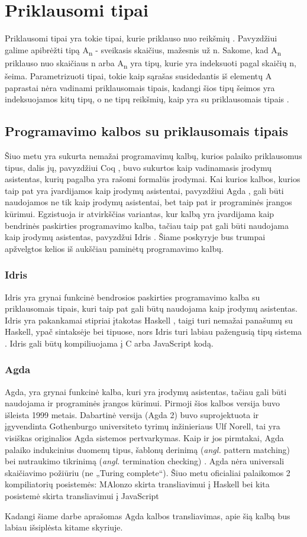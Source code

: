 \documentclass{VUMIFPSbakalaurinis}
\begin{document}
\section{Priklausomi tipai}
Priklausomi tipai yra tokie tipai, kurie priklauso nuo reikšmių \cite{depentantTypesAtWork}. Pavyzdžiui galime apibrėžti tipą A\textsubscript{n} - sveikasis skaičius, mažesnis už n. Sakome, kad A\textsubscript{n} priklauso nuo skaičiaus n arba A\textsubscript{n} yra tipų, kurie yra indeksuoti pagal skaičių n, šeima. Parametrizuoti tipai, tokie kaip sąrašas susidedantis iš elementų A paprastai nėra vadinami priklausomais tipais, kadangi šios tipų šeimos yra indeksuojamos kitų tipų, o ne tipų reikšmių, kaip yra su priklausomais tipais \cite{depentantTypesAtWork}.
\subsection{Programavimo kalbos su priklausomais tipais}
Šiuo metu yra sukurta nemažai programavimų kalbų, kurios palaiko priklausomus tipus, dalis jų, pavyzdžiui Coq \cite{coq}, buvo sukurtos kaip vadinamasis įrodymų asistentas, kurių pagalba yra rašomi formalūs įrodymai. Kai kurios kalbos, kurios taip pat yra įvardijamos kaip įrodymų asistentai, pavyzdžiui Agda \cite{agda_book}, gali būti naudojamos ne tik kaip įrodymų asistentai, bet taip pat ir programinės įrangos kūrimui. Egzistuoja ir atvirkščias variantas, kur kalbą yra įvardijama kaip bendrinės paskirties programavimo kalba, tačiau taip pat gali būti naudojama kaip įrodymų asistentas, pavyzdžui Idris \cite{idris}. Šiame poskyryje bus trumpai apžvelgtos kelios iš aukščiau paminėtų programavimo kalbų.
\subsubsection{Idris}
Idris yra grynai funkcinė bendrosios paskirties programavimo kalba su priklausomais tipais, kuri taip pat gali būtų naudojama kaip įrodymų asistentas. Idris yra pakankamai stipriai įtakotas Haskell \cite{haskell}, taigi turi nemažai panašumų su Haskell, ypač sintaksėje bei tipuose, nors Idris turi labiau pažengusią tipų sistema \cite{idris}. Idris gali būtų kompiliuojama į C arba JavaScript kodą.
\subsubsection{Agda}
Agda, yra grynai funkcinė kalba, kuri yra įrodymų asistentas, tačiau gali būti naudojama ir programinės įrangos kūrimui. Pirmoji šios kalbos versija buvo išleista 1999 metais. Dabartinė versija (Agda 2) buvo suprojektuota ir įgyvendinta Gothenburgo universiteto tyrimų inžinieriaus Ulf Norell, tai yra visiškas originalios Agda sistemos pertvarkymas. Kaip ir jos pirmtakai, Agda palaiko indukcinius duomenų tipus, šablonų derinimą (\textit{angl.} pattern matching) bei nutraukimo tikrinimą (\textit{angl.} termination checking) \cite{agda_overview}. Agda nėra universali skaičiavimo požiūriu (ne „Turing complete“). Šiuo metu oficialiai palaikomos 2 kompiliatorių posistemės: MAlonzo skirta transliavimui į Haskell bei kita posistemė skirta transliavimui į JavaScript \par Kadangi šiame darbe aprašomas Agda kalbos transliavimas, apie šią kalbą bus labiau išsiplėsta kitame skyriuje.
\end{document}
